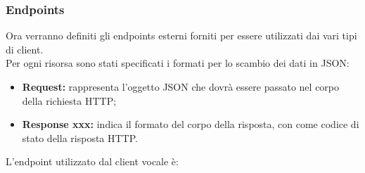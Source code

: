 \subsubsection{Endpoints}
	Ora verranno definiti gli endpoints esterni forniti per essere utilizzati dai vari tipi di client.\\
	Per ogni risorsa sono stati specificati i formati per lo scambio dei dati in JSON:
	\begin{itemize}
		\item \textbf{Request:} rappresenta l’oggetto JSON che dovrà essere passato nel corpo della richiesta HTTP;
		\item \textbf{Response xxx:} indica il formato del corpo della risposta, con  come codice di stato della risposta HTTP.
	\end{itemize}
	L'endpoint utilizzato dal client vocale è:
